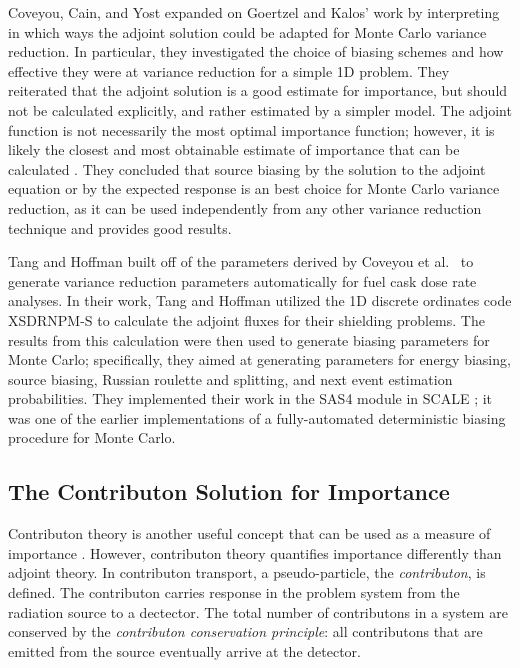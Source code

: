 Coveyou, Cain, and Yost \cite{coveyou_adjoint_1967} expanded on Goertzel and
Kalos' work by interpreting in which ways the adjoint solution could be adapted
for Monte Carlo variance reduction. In particular, they investigated the choice
of biasing schemes and how effective they were at variance reduction for a
simple 1D problem. They reiterated that the adjoint solution is a
good estimate for importance, but should not be calculated explicitly, and
rather estimated by a simpler model. The adjoint function is not necessarily the
most optimal importance function; however, it is likely the closest and most
obtainable estimate of importance that can be calculated
\cite{coveyou_adjoint_1967}. They
concluded that source biasing by the solution to the adjoint equation or by the
expected response is an best choice for Monte Carlo variance reduction, as it
can be used independently from any other variance reduction technique and
provides good results.

Tang and Hoffman \cite{tang_monte_1988} built off of the parameters derived by
Coveyou et al.\ \cite{coveyou_adjoint_1967} to generate variance reduction
parameters automatically for fuel cask dose rate analyses. In their work, Tang
and Hoffman utilized the 1D discrete ordinates code XSDRNPM-S to
calculate the adjoint fluxes for their shielding problems. The results from this
calculation were then used to generate biasing parameters for Monte Carlo;
specifically, they aimed at generating parameters for energy biasing, source
biasing, Russian roulette and splitting, and next event estimation
probabilities. They implemented their work in the SAS4 module in SCALE
\cite{SCALE6_1}; it was
one of the earlier implementations of a fully-automated deterministic
biasing procedure for Monte Carlo.

\subsection{The Contributon Solution for Importance}
\label{sec:ContributonImportance}

Contributon theory is another useful concept that can be used as a measure of
importance
\cite{williams_generalized_1991,williams_contributorn_1992,williams_contributon_study}.
However, contributon theory quantifies importance differently than
adjoint theory. In contributon transport, a pseudo-particle, the
\textit{contributon}, is defined. The contributon carries response in the problem
system from the radiation source to a dectector. The
total number of contributons in a system are conserved by the \textit{contributon
conservation principle}: all contributons that are emitted from the source
eventually arrive at the detector. 

